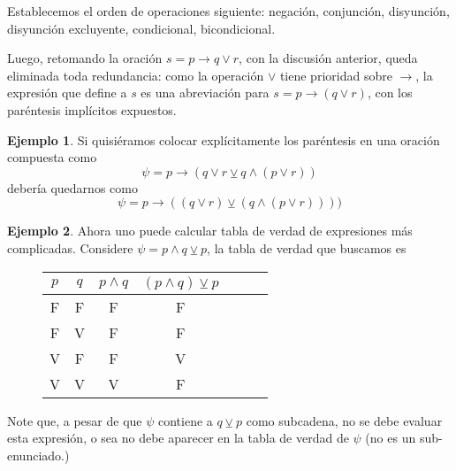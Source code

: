 \documentclass{book}
\theoremstyle{definition}
\newtheorem*{ejm}{Ejemplo}
\begin{document}
Establecemos el orden de operaciones siguiente: negación, conjunción, disyunción, disyunción excluyente, condicional, bicondicional.

Luego, retomando la oración $s=p\rightarrow q \vee r$, con la discusión anterior, queda eliminada toda redundancia: como la operación $\vee$ tiene prioridad sobre $\rightarrow$, la expresión que define a $s$ es una abreviación para $s=p\rightarrow (q \vee r)$, con los paréntesis implícitos expuestos.

\begin{ejm}
	Si quisiéramos colocar explícitamente los paréntesis en una oración compuesta como \[\psi = p \rightarrow (q \vee r \veebar q \wedge (p \vee r)) \]
	debería quedarnos como
	\[\psi = p \rightarrow ((q \vee r) \veebar (q \wedge (p \vee r)))) \]
\end{ejm}

\begin{ejm}
	Ahora uno puede calcular tabla de verdad de expresiones más complicadas. Considere $\psi = p \wedge q\veebar p$, la tabla de verdad que buscamos es
	\begin{figure}[h]
		\begin{center}\begin{tabular}{|c|c||c|c|c|c|c|}
				\hline 
				$p$& $q$ & $p \wedge q $ & $(p \wedge q) \veebar p$ \\
				\hline \hline
				F & F & F & F \\
				\hline
				F & V & F & F \\
				\hline
				V & F & F & V \\
				\hline
				V & V & V & F \\
				\hline
	\end{tabular}\end{center}\end{figure}
	
	Note que, a pesar de que $\psi$ contiene a $q\veebar p$ como subcadena, no se debe evaluar esta expresión, o sea no debe aparecer en la tabla de verdad de $\psi$ (no es un sub-enunciado.)
\end{ejm}
\end{document}
